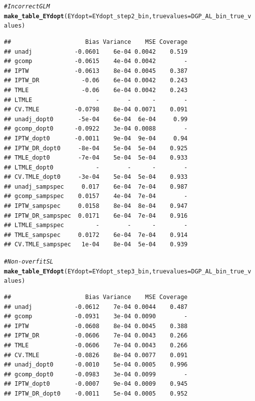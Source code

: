 \documentclass[11pt]{article}\usepackage[]{graphicx}\usepackage[]{color}
\makeatletter
\newcommand{\hlcom}[1]{\textcolor[rgb]{0.678,0.584,0.686}{\textit{#1}}}%
\newcommand{\hlstd}[1]{\textcolor[rgb]{0.345,0.345,0.345}{#1}}%
\newcommand{\hlkwc}[1]{\textcolor[rgb]{0.333,0.667,0.333}{#1}}%
\newcommand{\hlkwd}[1]{\textcolor[rgb]{0.737,0.353,0.396}{\textbf{#1}}}%
\newenvironment{kframe}{%
 \def\at@end@of@kframe{}%
 \ifinner\ifhmode%
  \def\at@end@of@kframe{\end{minipage}}%
  \begin{minipage}{\columnwidth}%
 \fi\fi%
 \def\FrameCommand##1{\hskip\@totalleftmargin \hskip-\fboxsep
 \colorbox{shadecolor}{##1}\hskip-\fboxsep
     \hskip-\linewidth \hskip-\@totalleftmargin \hskip\columnwidth}%
 \MakeFramed {\advance\hsize-\width
   \@totalleftmargin\z@ \linewidth\hsize
   \@setminipage}}%
 {\par\unskip\endMakeFramed%
 \at@end@of@kframe}
\newenvironment{knitrout}{}{} %
\makeatother
\begin{document}
\begin{knitrout}
\color{fgcolor}\begin{kframe}
\begin{alltt}
\hlcom{# Incorrect GLM}
\hlkwd{make_table_EYdopt}\hlstd{(}\hlkwc{EYdopt} \hlstd{= EYdopt_step2_bin,} \hlkwc{truevalues} \hlstd{= DGP_AL_bin_true_values)}
\end{alltt}
\begin{verbatim}
##                     Bias Variance    MSE Coverage
## unadj            -0.0601    6e-04 0.0042    0.519
## gcomp            -0.0615    4e-04 0.0042        -
## IPTW             -0.0613    8e-04 0.0045    0.387
## IPTW_DR            -0.06    6e-04 0.0042    0.243
## TMLE               -0.06    6e-04 0.0042    0.243
## LTMLE                  -        -      -        -
## CV.TMLE          -0.0798    8e-04 0.0071    0.091
## unadj_dopt0       -5e-04    6e-04  6e-04     0.99
## gcomp_dopt0      -0.0922    3e-04 0.0088        -
## IPTW_dopt0       -0.0011    9e-04  9e-04     0.94
## IPTW_DR_dopt0     -8e-04    5e-04  5e-04    0.925
## TMLE_dopt0        -7e-04    5e-04  5e-04    0.933
## LTMLE_dopt0            -        -      -        -
## CV.TMLE_dopt0     -3e-04    5e-04  5e-04    0.933
## unadj_sampspec     0.017    6e-04  7e-04    0.987
## gcomp_sampspec    0.0157    4e-04  7e-04        -
## IPTW_sampspec     0.0158    8e-04  8e-04    0.947
## IPTW_DR_sampspec  0.0171    6e-04  7e-04    0.916
## LTMLE_sampspec         -        -      -        -
## TMLE_sampspec     0.0172    6e-04  7e-04    0.914
## CV.TMLE_sampspec   1e-04    8e-04  5e-04    0.939
\end{verbatim}
\begin{alltt}
\hlcom{# Non-overfit SL}
\hlkwd{make_table_EYdopt}\hlstd{(}\hlkwc{EYdopt} \hlstd{= EYdopt_step3_bin,} \hlkwc{truevalues} \hlstd{= DGP_AL_bin_true_values)}
\end{alltt}
\begin{verbatim}
##                     Bias Variance    MSE Coverage
## unadj            -0.0612    7e-04 0.0044    0.487
## gcomp            -0.0931    3e-04 0.0090        -
## IPTW             -0.0608    8e-04 0.0045    0.388
## IPTW_DR          -0.0606    7e-04 0.0043    0.266
## TMLE             -0.0606    7e-04 0.0043    0.266
## CV.TMLE          -0.0826    8e-04 0.0077    0.091
## unadj_dopt0      -0.0010    5e-04 0.0005    0.996
## gcomp_dopt0      -0.0983    3e-04 0.0099        -
## IPTW_dopt0       -0.0007    9e-04 0.0009    0.945
## IPTW_DR_dopt0    -0.0011    5e-04 0.0005    0.952

\end{verbatim}
\end{kframe}
\end{knitrout}
\end{document}
